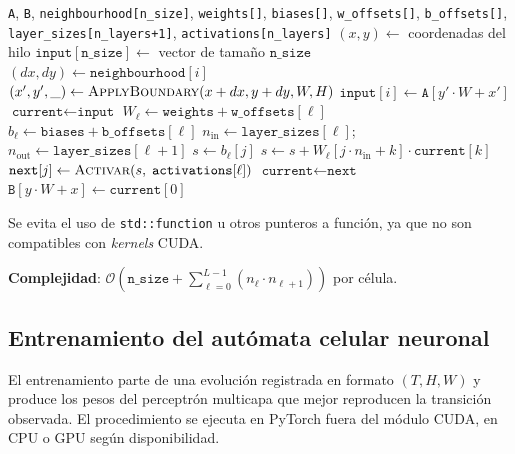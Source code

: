 \begin{breakablealgorithm}
\caption{ncaKernel: \textit{forward pass} del MLP por célula}
\label{alg:nca-fwd}
\begin{algorithmic}[1]
\Require \texttt{A}, \texttt{B}, \texttt{neighbourhood[n\_size]}, \texttt{weights[]}, \texttt{biases[]}, \texttt{w\_offsets[]}, \texttt{b\_offsets[]}, \texttt{layer\_sizes[n\_layers+1]}, \texttt{activations[n\_layers]}
\State $(x, y) \gets$ coordenadas del hilo
 \State \Return \EndIf
\State $\texttt{input}[\texttt{n\_size}] \gets$ vector de tamaño $\texttt{n\_size}$
    \State $(dx, dy) \gets \texttt{neighbourhood}[i]$
    \State $(x', y', \_) \gets \textsc{ApplyBoundary}(x + dx, y + dy, W, H)$
    \State $\texttt{input}[i] \gets \texttt{A}[y' \cdot W + x']$
\EndFor
\State $\texttt{current} \gets \texttt{input}$
    \State $W_\ell \gets \texttt{weights} + \texttt{w\_offsets}[\ell]$
    \State $b_\ell \gets \texttt{biases} + \texttt{b\_offsets}[\ell]$
    \State $n_{\text{in}} \gets \texttt{layer\_sizes}[\ell]$;\quad $n_{\text{out}} \gets \texttt{layer\_sizes}[\ell+1]$
        \State $s \gets b_\ell[j]$
            \State $s \gets s + W_\ell[j \cdot n_{\text{in}} + k] \cdot \texttt{current}[k]$
        \EndFor
        \State $\texttt{next}[j] \gets \textsc{Activar}(s,\; \texttt{activations}[\ell])$
    \EndFor
    \State $\texttt{current} \gets \texttt{next}$
\EndFor
\State $\texttt{B}[y \cdot W + x] \gets \texttt{current}[0]$
\end{algorithmic}
\end{breakablealgorithm}
Se evita el uso de \texttt{std::function} u otros punteros a función, ya que no son compatibles con \textit{kernels} CUDA.

\textbf{Complejidad}: $\displaystyle \mathcal{O}\left(\texttt{n\_size} + \sum_{\ell = 0}^{L - 1}(n_\ell \cdot n_{\ell+1})\right)$ por célula. 

\subsection{Entrenamiento del autómata celular neuronal}

El entrenamiento parte de una evolución registrada en formato $(T, H, W)$ y produce los pesos del perceptrón multicapa que mejor reproducen la transición observada. El procedimiento se ejecuta en PyTorch fuera del módulo CUDA, en CPU o GPU según disponibilidad.

